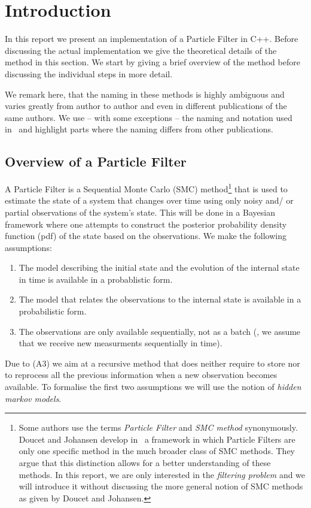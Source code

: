 \section*{Introduction}\label{sec:intro}
In this report we present an implementation of a Particle Filter in
C++. Before discussing the actual implementation we give the
theoretical details of the method in this section. We start by giving
a brief overview of the method before discussing the individual steps
in more detail.

We remark here, that the naming in these methods is highly ambiguous
and varies greatly from author to author and even in different
publications of the same authors. We use -- with some exceptions --
the naming and notation used in~\cite{doucet} and highlight parts
where the naming differs from other publications.

\subsection*{Overview of a Particle Filter}
A Particle Filter is a Sequential Monte Carlo (SMC)
method\footnote{Some authors use the terms \emph{Particle Filter} and
  \emph{SMC method} synonymously. Doucet and Johansen develop
  in~\cite{doucet} a framework in which Particle Filters are only one
  specific method in the much broader class of SMC methods. They argue
  that this distinction allows for a better understanding of these
  methods. In this report, we are only interested in the
  \emph{filtering problem} and we will introduce it without discussing
  the more general notion of SMC methods as given by Doucet and
  Johansen.} that is used to estimate the state of a system that
changes over time using only noisy and/ or partial observations of the
system's state. This will be done in a Bayesian framework where one
attempts to construct the posterior probability density function (pdf)
of the state based on the observations. We make the following
assumptions:
\begin{enumerate}[label=(A\arabic*)]
\item The model describing the initial state and the evolution of the
  internal state in time is available in a probablistic form.
\item The model that relates the observations to the internal state is
  available in a probabilistic form.
\item The observations are only available sequentially, not as a batch
  (\ie, we assume that we receive new measurments sequentially in
  time).
\end{enumerate}
Due to (A3) we aim at a recursive method that does neither require to
store nor to reprocess all the previous information when a new
observation becomes available. To formalise the first two assumptions
we will use the notion of \emph{hidden markov models}.

